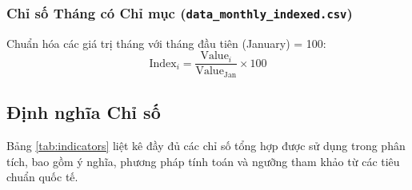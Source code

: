\documentclass[12pt,a4paper]{article}
\begin{document}
\subsubsection{Chỉ số Tháng có Chỉ mục (\texttt{data\_monthly\_indexed.csv})}
Chuẩn hóa các giá trị tháng với tháng đầu tiên (January) = 100:
\[
\text{Index}_i = \frac{\text{Value}_i}{\text{Value}_{\text{Jan}}} \times 100
\]

\subsection{Định nghĩa Chỉ số}

Bảng \ref{tab:indicators} liệt kê đầy đủ các chỉ số tổng hợp được sử dụng trong phân tích, bao gồm ý nghĩa, phương pháp tính toán và ngưỡng tham khảo từ các tiêu chuẩn quốc tế.
\end{document}
